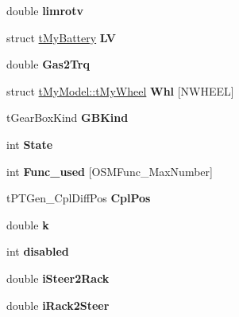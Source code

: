\begin{DoxyCompactItemize}
double {\bfseries limrotv}
\item 
\mbox{\label{structt_my_model_a65ab6757d47084dec24c5a48f1c0d3fd}} 
struct \mbox{\hyperlink{structt_my_battery}{t\+My\+Battery}} {\bfseries LV}
\item 
\mbox{\label{structt_my_model_afc561b87bb23ed92d67050ba8b52390f}} 
double {\bfseries Gas2\+Trq}
\item 
\mbox{\label{structt_my_model_ac9c4c7135a14aa06c6490df22b6c2eb6}} 
struct \mbox{\hyperlink{structt_my_model_1_1t_my_wheel}{t\+My\+Model\+::t\+My\+Wheel}} {\bfseries Whl} \mbox{[}N\+W\+H\+E\+EL\mbox{]}
\item 
\mbox{\label{structt_my_model_ac67ed0f3caf66b4ac64e61b7b187ac31}} 
t\+Gear\+Box\+Kind {\bfseries G\+B\+Kind}
\item 
\mbox{\label{structt_my_model_aa0a86d05184fb40dbbf008108f783b0b}} 
int {\bfseries State}
\item 
\mbox{\label{structt_my_model_a722f9a2d32c15cbe6fcd00e9384c699d}} 
int {\bfseries Func\+\_\+used} \mbox{[}O\+S\+M\+Func\+\_\+\+Max\+Number\mbox{]}
\item 
\mbox{\label{structt_my_model_a8f46af021c7c5c1b961da7432676cb61}} 
t\+P\+T\+Gen\+\_\+\+Cpl\+Diff\+Pos {\bfseries Cpl\+Pos}
\item 
\mbox{\label{structt_my_model_a5b6cffa20b95b31a3700d9c697616431}} 
double {\bfseries k}
\item 
\mbox{\label{structt_my_model_a038520b97f11c25e3eae3de137675ba7}} 
int {\bfseries disabled}
\item 
\mbox{\label{structt_my_model_a87bddbbbd9ff821c8a6645f7ebf13487}} 
double {\bfseries i\+Steer2\+Rack}
\item 
\mbox{\label{structt_my_model_a4f95b88b861fbaf501d6a7c9b8536daf}} 
double {\bfseries i\+Rack2\+Steer}
\item 
\mbox{\label{structt_my_model_acbc6e8c8c8ab187e648dc60a679cfe6b}} 

\end{DoxyCompactItemize}
